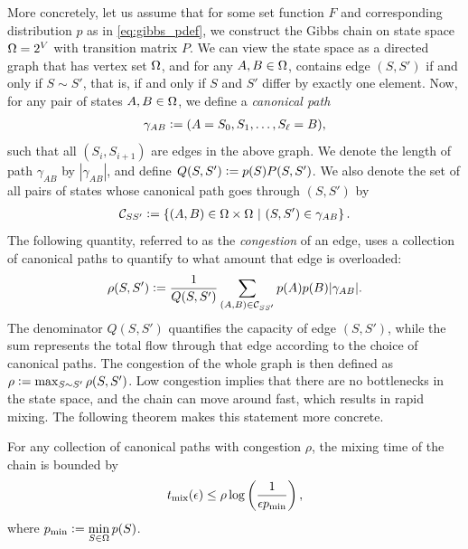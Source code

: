 More concretely, let us assume that for some set function $F$ and corresponding distribution $p$ as in \eqref{eq:gibbs_pdef}, we construct the Gibbs chain on state space $\ss = 2^V$ with transition matrix $P$.
We can view the state space as a directed graph that has vertex set $\ss$, and for any $A, B \in \ss$, contains edge $(S, S')$ if and only if $S \sim S'$, that is, if and only if $S$ and $S'$ differ by exactly one element.
Now, for any pair of states $A, B \in \ss$, we define a \emph{canonical path}
\begin{align*}
\gamma_{AB} \defeq (A = S_0, S_1, \ldots, S_{\ell} = B),
\end{align*}
such that all $(S_i, S_{i+1})$ are edges in the above graph.
We denote the length of path $\gamma_{AB}$ by $|\gamma_{AB}|$, and define $Q(S, S') \defeq p(S) P(S, S')$.
We also denote the set of all pairs of states whose canonical path goes through $(S, S')$ by
\begin{align*}
\mathcal{C}_{SS'} \defeq \sdef{(A, B) \in \ss \times \ss}{(S, S') \in \gamma_{AB}}.
\end{align*}
The following quantity, referred to as the \emph{congestion} of an edge, uses a collection of canonical paths to quantify to what amount that edge is overloaded:
\begin{align} \label{eq:cong}
  \rho(S, S') \defeq \frac{1}{Q(S, S')} \sum_{(A, B) \in \mathcal{C}_{SS'}} p(A) p(B) |\gamma_{AB}|.
\end{align}
The denominator $Q(S, S')$ quantifies the capacity of edge $(S, S')$, while the sum represents the total flow through that edge according to the choice of canonical paths.
The congestion of the whole graph is then defined as $\rho \defeq \max_{S \sim S'}\rho(S, S')$.
Low congestion implies that there are no bottlenecks in the state space, and the chain can move around fast, which results in rapid mixing.
The following theorem makes this statement more concrete.

\begin{theorem} \label{thm:cpath}
  For any collection of canonical paths with congestion $\rho$, the mixing time of the chain is bounded by
  \begin{align*}
  	\tme \leq \rho \log\left(\frac{1}{\epsilon p_{\mathrm{min}}}\right),
  \end{align*}
where $p_{\mathrm{min}} \defeq \displaystyle\min_{S \in \ss}p(S)$.
\end{theorem}

